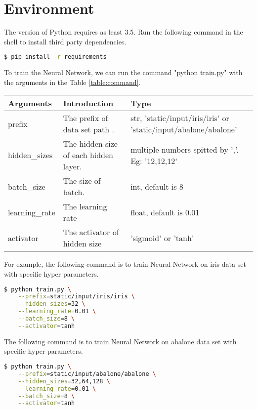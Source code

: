 \section{Environment}
\vspace*{-.05in}

The version of Python requires as least 3.5. Run the following command in the shell to install third party dependencies.
\begin{lstlisting}[language=bash]
$ pip install -r requirements
\end{lstlisting}

To train the Neural Network, we can run the command "python train.py" with the arguments in the Table \ref{table:command}.
\begin{table*}[hbt]
	\caption{The arguments for train.py}
	\label{table:command}
	
	\centering
	\begin{tabular}{l|l|l}		
		Arguments		&Introduction								&Type \\ \hline
		prefix	 		&The prefix of data set path	.				&str, 'static/input/iris/iris' or 'static/input/abalone/abalone'	 \\
		hidden\_sizes 	&The hidden size of each hidden layer.		&multiple numbers spitted by ','. Eg: '12,12,12' \\
		batch\_size	 	&The size of batch.							&int, default is 8 \\
		learning\_rate	&The learning rate							&float, default is 0.01 \\
		activator		&The activator of hidden size				&'sigmoid' or 'tanh'
	\end{tabular}
\end{table*}
For example, the following command is to train Neural Network on iris data set with specific hyper parameters.
\begin{lstlisting}[language=bash]
$ python train.py \
    --prefix=static/input/iris/iris \
    --hidden_sizes=32 \
    --learning_rate=0.01 \
    --batch_size=8 \
    --activator=tanh                 
\end{lstlisting}
The following command is to train Neural Network on abalone data set with specific hyper parameters.
\begin{lstlisting}[language=bash]
$ python train.py \
    --prefix=static/input/abalone/abalone \
    --hidden_sizes=32,64,128 \
    --learning_rate=0.01 \
    --batch_size=8 \
    --activator=tanh                 
\end{lstlisting}
